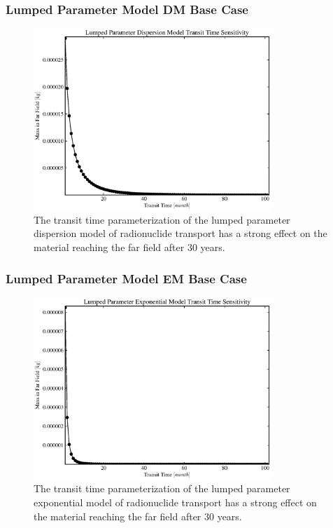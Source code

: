 
\begin{frame}[ctb!]
\frametitle{Lumped Parameter Model DM Base Case}
\begin{figure}[ht]
\centering
\includegraphics[width=0.8\textwidth]{./images/lpDM_t_t.eps}
\caption[Lumped Parameter Dispersion Model Transit Time Sensitivity]{The transit time 
parameterization of the lumped parameter dispersion model of radionuclide 
transport has a strong effect on the material reaching the far field after 30 
years.  }
\label{fig:lp_t_t_begin}
\end{figure}
\end{frame}

\begin{frame}[ctb!]
\frametitle{Lumped Parameter Model EM Base Case}
\begin{figure}[ht]
\centering
\includegraphics[width=0.8\textwidth]{./images/lpEXPM_t_t.eps}
\caption[Lumped Parameter Exponential Model Transit Time Sensitivity]{The transit time 
parameterization of the lumped parameter exponential model of radionuclide 
transport has a strong effect on the material reaching the far field after 30 
years.  }
\end{figure}
\end{frame}

